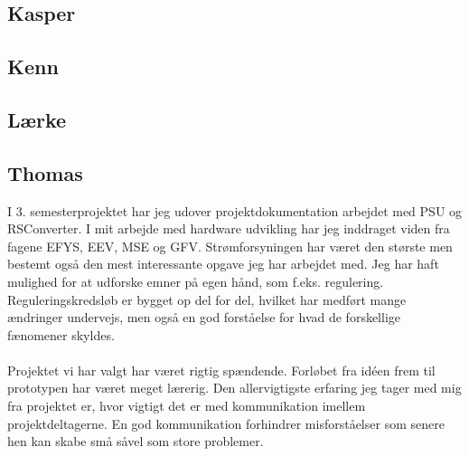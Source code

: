 \subsection{Kasper}

\subsection{Kenn}

\subsection{Lærke}

\subsection{Thomas}
I 3. semesterprojektet har jeg udover projektdokumentation arbejdet med PSU og RSConverter. I mit arbejde med hardware udvikling har jeg inddraget viden fra fagene EFYS, EEV, MSE og GFV. Strømforsyningen har været den største men bestemt også den mest interessante opgave jeg har arbejdet med. Jeg har haft mulighed for at udforske emner på egen hånd, som f.eks. regulering. Reguleringskredsløb er bygget op del for del, hvilket har medført mange ændringer undervejs, men også en god forståelse for hvad de forskellige fænomener skyldes.
\\\\
Projektet vi har valgt har været rigtig spændende. Forløbet fra idéen frem til prototypen har været meget lærerig. Den allervigtigste erfaring jeg tager med mig fra projektet er, hvor vigtigt det er med kommunikation imellem projektdeltagerne. En god kommunikation forhindrer misforståelser som senere hen kan skabe små såvel som store problemer.